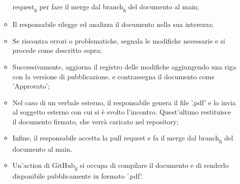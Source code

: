 \begin{itemize}
\begin{itemize}
                        request\textsubscript{g} per fare il merge dal branch\textsubscript{g} del
                        documento al main;
                  \item Il responsabile rilegge ed analizza il documento nella sua interezza;
                  \item Se riscontra errori o problematiche, segnala le modifiche necessarie e si
                        procede come descritto sopra;
                  \item Successivamente, aggiorna il registro delle modifiche aggiungendo una riga con
                        la versione di pubblicazione, e contrassegna il documento come 'Approvato';
                  \item Nel caso di un verbale esterno, il responsabile genera il file '.pdf' e lo
                        invia al soggetto esterno con cui si è svolto l'incontro. Quest'ultimo restituisce il
                        documento firmato, che verrà caricato nel repository;
                  \item Infine, il responsabile accetta la pull request e fa il merge dal
                        branch\textsubscript{g} del documento al main.
                  \item Un'action di GitHub\textsubscript{g} si occupa di compilare il documento e di
                        renderlo disponibile pubblicamente in formato '.pdf'.
            \end{itemize}
\end{itemize}

\newpage
